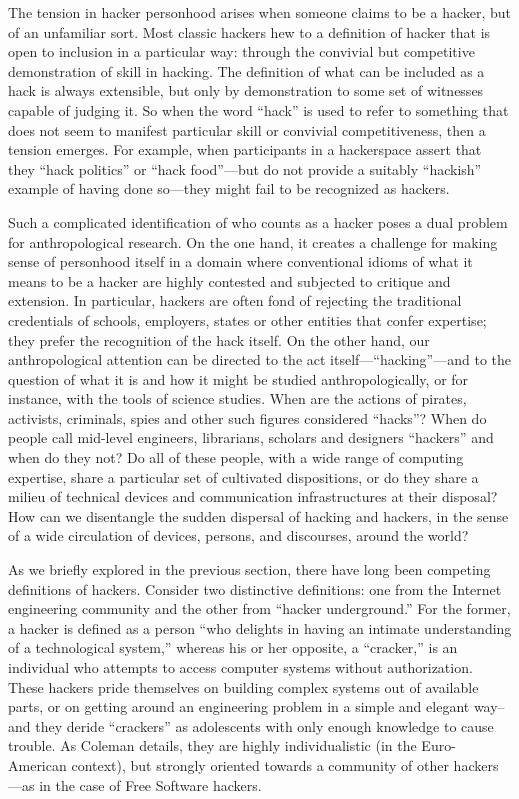 \documentclass[10pt,letter,oneside]{scrartcl}
\begin{document}
The tension in hacker personhood arises when someone claims to be a hacker,
but of an unfamiliar sort.  Most classic hackers hew to a definition of hacker
that is open to inclusion in a particular way: through the convivial but
competitive demonstration of skill in hacking.  The definition of what can be
included as a hack is always extensible, but only by demonstration to some set
of witnesses capable of judging it.   So when the word ``hack'' is used to refer
to something that does not seem to manifest particular skill or convivial
competitiveness, then a tension emerges. For example, when participants in a
hackerspace assert that they ``hack politics'' or ``hack food''---but do not
provide a suitably ``hackish'' example of having done so---they might fail to be
recognized as hackers. 

Such a complicated identification of who counts as a hacker poses a dual problem
for anthropological research.  On the one hand, it creates a challenge for
making sense of personhood itself in a domain where conventional idioms of what
it means to be a hacker are highly contested and subjected to critique and
extension.  In particular, hackers are often fond of rejecting the traditional
credentials of schools, employers, states or other entities that confer
expertise; they prefer the recognition of the hack itself. On the other hand,
our anthropological attention can be directed to the act
itself---``hacking''---and to the question of what it is and how it might be
studied anthropologically, or for instance, with the tools of science
studies. When are the actions of pirates, activists, criminals, spies and other
such figures considered ``hacks''?  When do people call mid-level engineers,
librarians, scholars and designers ``hackers'' and when do they not?  Do all of
these people, with a wide range of computing expertise, share a particular set
of cultivated dispositions, or do they share a milieu of technical devices and
communication infrastructures at their disposal?  How can we disentangle the
sudden dispersal of hacking and hackers, in the sense of a wide circulation of
devices, persons, and discourses, around the world?

As we briefly explored in the previous section, there have long been competing
definitions of hackers.  Consider two distinctive definitions: one from the
Internet engineering community and the other from ``hacker underground.''  For
the former, a hacker is defined as a person ``who delights in having an intimate
understanding of a technological system,'' whereas his or her opposite, a
``cracker,'' is an individual who attempts to access computer systems without
authorization.  These hackers pride themselves on building complex systems out
of available parts, or on getting around an engineering problem in a simple and
elegant way--and they deride ``crackers'' as adolescents with only enough
knowledge to cause trouble.  As Coleman \parencite*{coleman_coding_2012} details,
they are highly individualistic (in the Euro-American context), but strongly
oriented towards a community of other hackers---as in the case of Free Software
hackers. 
\end{document}
